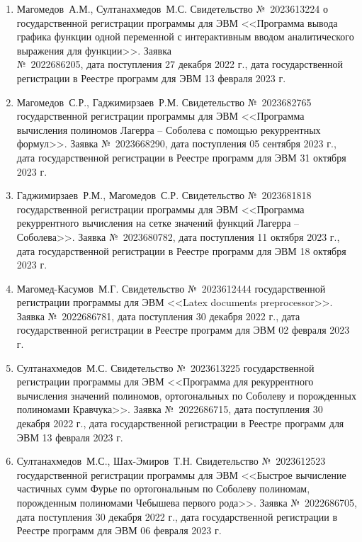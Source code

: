 \begin{enumerate}

    \item Магомедов~А.М., Султанахмедов~М.С. Свидетельство №~2023613224 о государственной регистрации программы для ЭВМ <<Программа вывода графика функции одной переменной с интерактивным вводом аналитического выражения для функции>>. Заявка \\№~2022686205, дата поступления 27 декабря 2022 г., дата государственной регистрации в Реестре программ для ЭВМ 13 февраля 2023 г.  
    
    \item
    {Магомедов~С.Р., Гаджимирзаев~Р.М.} 
    Свидетельство №~2023682765 государственной регистрации программы для ЭВМ <<Программа вычисления полиномов Лагерра -- Соболева с помощью рекуррентных формул>>. Заявка №~2023668290, дата поступления 05 сентября 2023 г., дата государственной регистрации в Реестре программ для ЭВМ 31 октября 2023 г.

    \item
    {Гаджимирзаев~Р.М., Магомедов~С.Р.} 
    Свидетельство №~2023681818 государственной регистрации программы для ЭВМ <<Программа рекуррентного вычисления на сетке значений функций Лагерра -- Соболева>>. Заявка №~2023680782, дата поступления 11 октября 2023 г., дата государственной регистрации в Реестре программ для ЭВМ 18 октября 2023 г.

    \item
    {Магомед-Касумов~М.Г.}
    Свидетельство №~2023612444 государственной регистрации программы для ЭВМ <<Latex documents preprocessor>>. Заявка №~2022686781, дата поступления 30 декабря 2022 г., дата государственной регистрации в Реестре программ для ЭВМ 02 февраля 2023 г.

    \item
    {Султанахмедов~М.С.}
    Свидетельство №~2023613225 государственной регистрации программы для ЭВМ <<Программа для рекуррентного вычисления значений полиномов, ортогональных по Соболеву и порожденных полиномами Кравчука>>. Заявка №~2022686715, дата поступления 30 декабря 2022 г., дата государственной регистрации в Реестре программ для ЭВМ 13 февраля 2023 г.

    \item
    {Султанахмедов~М.С., Шах-Эмиров~Т.Н.}
    Свидетельство №~2023612523 государственной регистрации программы для ЭВМ <<Быстрое вычисление частичных сумм Фурье по ортогональным по Соболеву полиномам, порожденным полиномами Чебышева первого рода>>. Заявка №~2022686705, дата поступления 30 декабря 2022 г., дата государственной регистрации в Реестре программ для ЭВМ 06 февраля 2023 г.

\end{enumerate}
